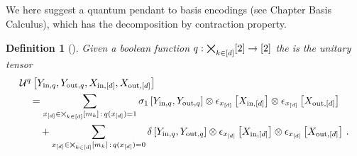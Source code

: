\documentclass[aps,onecolumn,nofootinbib,pra]{article}
\newtheorem{definition}{Definition}
\begin{document}
    \subsection{\ComputationCircuits{}}

    We here suggest a quantum pendant to basis encodings (see Chapter Basis Calculus), which has the decomposition by contraction property.

    \begin{definition}[\ComputationCircuit{}]
        Given a boolean function $q:\bigtimes_{k\in[d]}[2]\rightarrow[2]$ the \computationCircuit{} is the unitary tensor
        \begin{align*}
            &\mathcal{U}^{q}\left[Y_{\mathrm{in},q},Y_{\mathrm{out},q},X_{\mathrm{in},[d]},X_{\mathrm{out},[d]}\right] \\
            &\quad=
            \sum_{x_{[d]}\in\bigtimes_{k\in[d]}[m_{k}]\,:\,q(x_{[d]})=1}
            \sigma_1\left[Y_{\mathrm{in},q},Y_{\mathrm{out},q}\right] \otimes
            \epsilon_{x_{[d]}}\left[X_{\mathrm{in},[d]}\right] \otimes \epsilon_{x_{[d]}}\left[X_{\mathrm{out},[d]}\right] \\
            & \quad \quad +
            \sum_{x_{[d]}\in\bigtimes_{k\in[d]}[m_{k}]\,:\,q(x_{[d]})=0}
            \delta\left[Y_{\mathrm{in},q},Y_{\mathrm{out},q}\right] \otimes
            \epsilon_{x_{[d]}}\left[X_{\mathrm{in},[d]}\right] \otimes \epsilon_{x_{[d]}}\left[X_{\mathrm{out},[d]}\right] \, .
        \end{align*}
    \end{definition}
\end{document}
